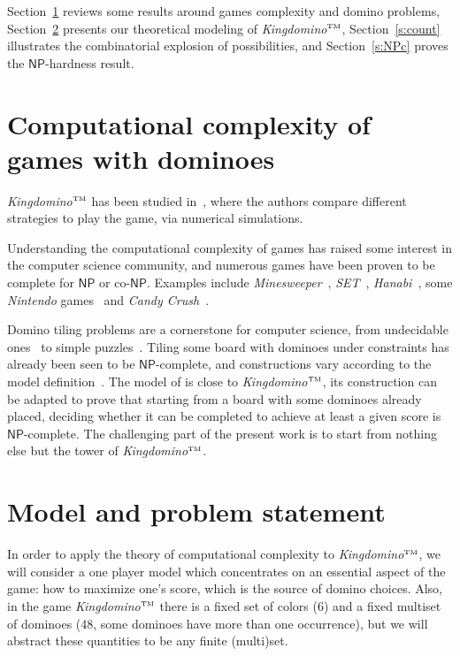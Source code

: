 \documentclass[11pt,a4paper]{article}
\newcommand{\1}{\mathbb{1}}
\newcommand{\0}{\mathbb{0}}
\newcommand{\NP}{{\mathsf{NP}}}
\newcommand{\coNP}{\text{co-}{\mathsf{NP}}}
\newcommand{\tm}{$^\text{\tiny TM}$}
\begin{document}
Section~\ref{s:games} reviews some results around games complexity and domino
problems, Section~\ref{s:model} presents our theoretical modeling of {\em
Kingdomino\tm}, Section~\ref{s:count} illustrates the combinatorial explosion
of possibilities, and Section~\ref{s:NPc} proves the $\NP$-hardness result.

\section{Computational complexity of games with dominoes}
\label{s:games}

{\em Kingdomino\tm} has been studied in~\cite{kingdomino18}, where the authors compare different strategies to play the game, via numerical simulations.

Understanding the computational complexity of games has raised some interest
in the computer science community, and numerous games have been proven to be
complete for $\NP$ or $\coNP$.
Examples include
{\em Minesweeper}~\cite{mine1,mine2},
{\em SET}~\cite{gameset},
{\em Hanabi}~\cite{hanabi},
some {\em Nintendo} games~\cite{nintendo} and
{\em Candy Crush}~\cite{candy1}.%

Domino tiling problems are a cornerstone for computer
science, from undecidable ones~\cite{b66,jr15,k08}
to simple puzzles~\cite{h76,ku68,s10}.
Tiling some board with dominoes under constraints
has already been seen to be $\NP$-complete, and constructions 
vary according to the model definition~\cite{b08,er13,mr01,py13}.
The model of \cite{ww04} is close to {\em Kingdomino\tm}, its
construction can be adapted to prove that starting from a board
with some dominoes already placed, deciding whether it can be completed
to achieve at least a given score is $\NP$-complete.
The challenging part
of the present work is to start from nothing else but
the tower of {\em Kingdomino\tm}.

\section{Model and problem statement}
\label{s:model}

In order to apply the theory of
computational complexity to {\em Kingdomino\tm}, we will consider a one player model
which concentrates on an essential aspect of the game: how to
maximize one's score, which is the source of domino choices. Also, in the game
{\em Kingdomino\tm} there is a fixed set of colors (6) and a fixed multiset of
dominoes (48, some dominoes have more than one occurrence), but we will
abstract these quantities to be any finite (multi)set.
\end{document}
